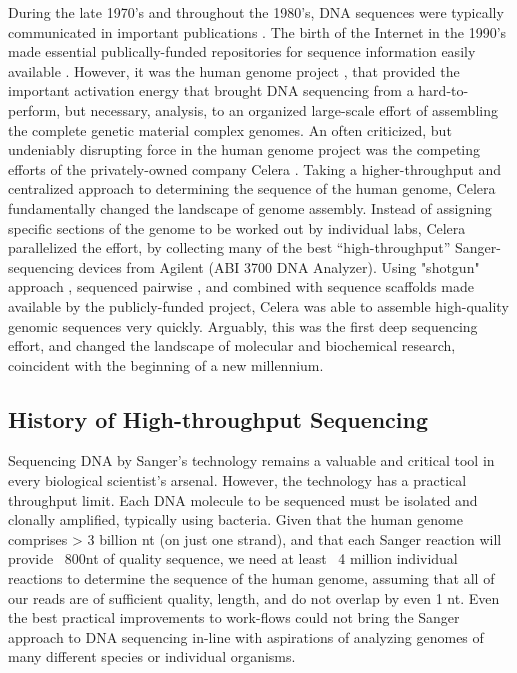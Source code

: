 During the late 1970’s and throughout the 1980’s, DNA sequences were typically communicated in important publications \citep{Cordell1980a,Sanger1978a}. The birth of the Internet in the 1990’s made essential publically-funded repositories for sequence information easily available \citep{Benson2011a}. However, it was the human genome project \citep{Lander2011a,Venter2001}, that provided the important activation energy that brought DNA sequencing from a hard-to-perform, but necessary, analysis, to an organized large-scale effort of assembling the complete genetic material complex genomes. An often criticized, but undeniably disrupting force in the human genome project was the competing efforts of the privately-owned company Celera \citep{Venter2008a}. Taking a higher-throughput and centralized approach to determining the sequence of the human genome, Celera fundamentally changed the landscape of genome assembly. Instead of assigning specific sections of the genome to be worked out by individual labs, Celera parallelized the effort, by collecting many of the best “high-throughput” Sanger-sequencing devices from Agilent (ABI 3700 DNA Analyzer). Using "shotgun" approach \citep{Staden1979}, sequenced pairwise \citep{Roach1995}, and combined with sequence scaffolds made available by the publicly-funded project, Celera was able to assemble high-quality genomic sequences very quickly. Arguably, this was the first deep sequencing effort, and changed the landscape of molecular and biochemical research, coincident with the beginning of a new millennium.

\subsection{History of High-throughput Sequencing}

Sequencing DNA by Sanger’s technology remains a valuable and critical tool in every biological scientist’s arsenal. However, the technology has a practical throughput limit. Each DNA molecule to be sequenced must be isolated and clonally amplified, typically using bacteria. Given that the human genome \citep{Hattori2005a} comprises > 3 billion nt (on just one strand), and that each Sanger reaction will provide ~800nt of quality sequence, we need at least ~4 million individual reactions to determine the sequence of the human genome, assuming that all of our reads are of sufficient quality, length, and do not overlap by even 1 nt. Even the best practical improvements to work-flows could not bring the Sanger approach to DNA sequencing in-line with aspirations of analyzing genomes of many different species or individual organisms.

